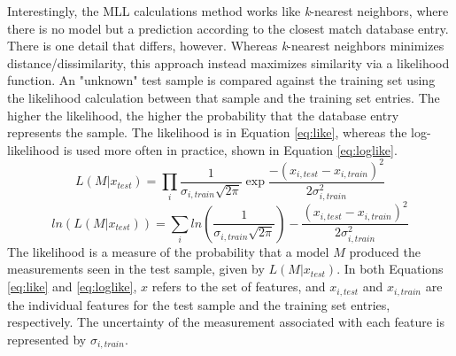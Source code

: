 Interestingly, the \gls{MLL} calculations method works like \textit{k}-nearest
neighbors, where there is no model but a prediction according to the closest
match database entry.  There is one detail that differs, however. Whereas
\textit{k}-nearest neighbors minimizes distance/dissimilarity, this approach
instead maximizes similarity via a likelihood function. An "unknown" test
sample is compared against the training set using the likelihood calculation
between that sample and the training set entries.  The higher the likelihood,
the higher the probability that the database entry represents the sample. The
likelihood is in Equation \ref{eq:like}, whereas the log-likelihood is used
more often in practice, shown in Equation \ref{eq:loglike}.
\begin{equation}
  L(M|x_{test}) = \prod_i \frac{1}{\sigma_{i,train} \sqrt{2\pi}} \exp{\frac{-(x_{i,test} - x_{i,train})^2}{2 \sigma_{i,train}^2}}
  \label{eq:like}
\end{equation}
\begin{equation}
  ln(L(M|x_{test})) = \sum_i ln(\frac{1}{\sigma_{i,train} \sqrt{2\pi}}) - \frac{(x_{i,test} - x_{i,train})^2}{2 \sigma_{i,train}^2}
  \label{eq:loglike}
\end{equation}
The likelihood is a measure of the probability that a model $M$ produced the
measurements seen in the test sample, given by $L(M|x_{test})$.  In both
Equations \ref{eq:like} and \ref{eq:loglike}, $x$ refers to the set of
features, and $x_{i, test}$ and $x_{i,train}$ are the individual features for the
test sample and the training set entries, respectively. The uncertainty of the
measurement associated with each feature is represented by $\sigma_{i,train}$.

